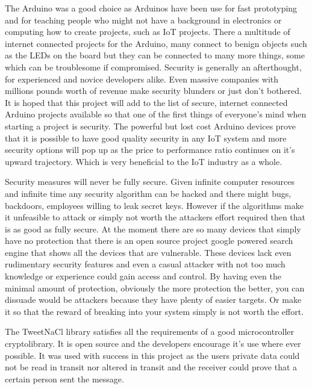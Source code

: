 The Arduino was a good choice as Arduinos have been use for fast prototyping and for teaching people who might not have a background in electronics or computing how to create projects, such as IoT projects. There a multitude of internet connected projects for the Arduino, many connect to benign objects such as the LEDs on the board but they can be connected to many more things, some which can be troublesome if compromised. Security is generally an afterthought, for experienced and novice developers alike. Even massive companies with millions pounds worth of revenue make security blunders or just don't bothered. It is hoped that this project will add to the list of secure, internet connected Arduino projects available so that one of the first things of everyone's mind when starting a project is security. The powerful but lost cost Arduino devices prove that it is possible to have good quality security in any IoT system and more security options will pop up as the price to performance ratio continues on it's upward trajectory. Which is very beneficial to the IoT industry as a whole.

Security measures will never be fully secure. Given infinite computer resources and infinite time any security algorithm can be hacked and there might bugs, backdoors, employees willing to leak secret keys. However if the algorithms make it unfeasible to attack or simply not worth the attackers effort required then that is as good as fully secure. At the moment there are so many devices that simply have no protection that there is an open source project google powered search engine that shows all the devices that are vulnerable\cite{censys}. These devices lack even rudimentary security features and even a casual attacker with not too much knowledge or experience could gain access and control. By having even the minimal amount of protection, obviously the more protection the better, you can dissuade would be attackers because they have plenty of easier targets. Or make it so that the reward of breaking into your system simply is not worth the effort.

The TweetNaCl library satisfies all the requirements of a good microcontroller cryptolibrary. It is open source and the developers encourage it's use where ever possible. It was used with success in this project as the users private data could not be read in transit nor altered in transit and the receiver could prove that a certain person sent the message. 
